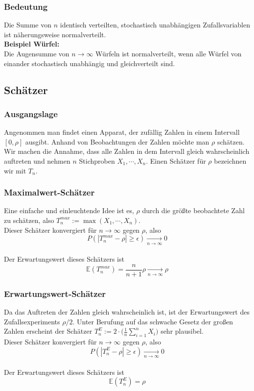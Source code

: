 \documentclass[a4paper]{article}
\begin{document}
\subsubsection{Bedeutung}
Die Summe von $n$ identisch verteilten, stochastisch unabhängigen Zufallsvariablen ist näherungsweise normalverteilt.\\

\textbf{Beispiel Würfel:}\\
Die Augensumme von $n \to \infty$ Würfeln ist normalverteilt, wenn alle Würfel von einander stochastisch unabhängig und gleichverteilt sind.

\pagebreak
\subsection{Schätzer}

\subsubsection{Ausgangslage}
Angenommen man findet einen Apparat, der zufällig Zahlen in einem Intervall $[0, \rho]$ ausgibt. Anhand von Beobachtungen der Zahlen möchte man $\rho$ schätzen. Wir machen die Annahme, dass alle Zahlen in dem Intervall gleich wahrscheinlich auftreten und  nehmen $n$ Stichproben $X_1, \cdots, X_n$. Einen Schätzer für $\rho$ bezeichnen wir mit $T_n$.

\subsubsection{Maximalwert-Schätzer}
Eine einfache und einleuchtende Idee ist es, $\rho$ durch die größte beobachtete Zahl zu schätzen, also
$T_n^{max} := \max(X_1, \cdots, X_n)$.\\
Dieser Schätzer konvergiert für $n \to \infty$ gegen $\rho$, also $$P(| T_n^{max} - \rho | \geq \epsilon) \underset{n \to \infty}{\longrightarrow} 0$$\\
Der Erwartungswert dieses Schätzers ist $$ \mathbb{E}(T_n^{max} ) = \frac{n}{n+1} \rho    \underset{n \to \infty}{\longrightarrow} \rho$$


\subsubsection{Erwartungswert-Schätzer}
Da das Auftreten der Zahlen gleich wahrscheinlich ist, ist der Erwartungswert des Zufallsexperiments $\rho /2$. Unter Berufung auf das  schwache Gesetz der großen Zahlen erscheint der Schätzer
$T_n^{E} :=  2 \cdot \biggl( \frac{1}{n} \sum_{i=1}^n X_i \biggr)$ sehr plausibel.\\
Dieser Schätzer konvergiert für $n \to \infty$ gegen $\rho$, also $$P(| T_n^{E} - \rho | \geq \epsilon) \underset{n \to \infty}{\longrightarrow} 0$$\\
Der Erwartungswert dieses Schätzers ist $$ \mathbb{E}(T_n^{E} ) = \rho$$
\end{document}

